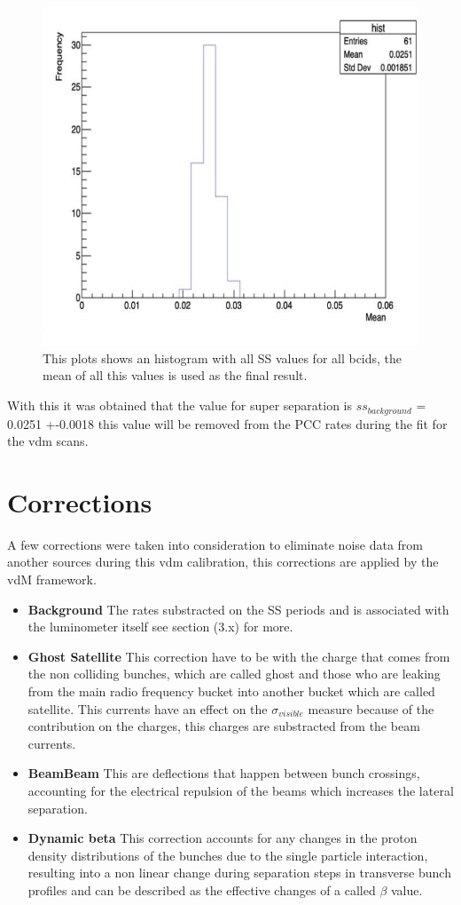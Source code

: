 \begin{figure}[H]
    \centering
    \includegraphics[height = 0.45 \textwidth ,width=1\textwidth]{ssthist.png}
    \caption{This plots shows an histogram with all SS values for all bcids, the mean of all this values is used as the final result.}
    \label{fig:Histogram}
\end{figure}

With this it was obtained that the value for super separation is $ss_{background}$ = 0.0251 +-0.0018 this value will be removed from the PCC rates during the fit for the vdm scans. 

\section{Corrections}

A few corrections were taken into consideration to eliminate noise data from another sources during this vdm calibration, this corrections are applied by the vdM framework. 

\begin{itemize}
  \item \textbf{Background} The rates substracted on the SS periods and is associated with the luminometer itself see section (3.x) for more.
  \item \textbf {Ghost Satellite} This correction have to be with the charge that comes from the non colliding bunches, which are called ghost and those who are leaking from the main radio frequency bucket into another bucket which are called satellite. This currents have an effect on the $\sigma_{visible}$ measure because of the contribution on the charges, this charges are substracted from the beam currents.  \cite{ghost}
  \item \textbf{BeamBeam} This are deflections that happen between bunch crossings, accounting for the electrical repulsion of the beams which increases the lateral separation.   \cite{beambeam}
  \item \textbf{Dynamic beta} This correction accounts for any changes in the proton density distributions of the bunches due to the single particle interaction, resulting into a non linear change during separation steps in transverse bunch profiles and can be described as the effective changes of a called $\beta$ value. \cite{LHClum}
\end{itemize}


